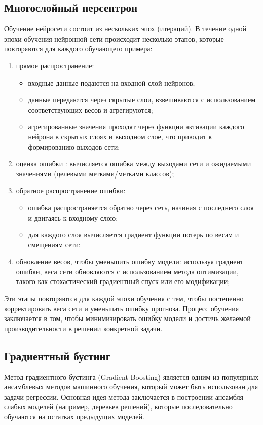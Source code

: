 \subsection{Многослойный персептрон}
Обучение нейросети состоит из нескольких эпох (итераций). В течение одной эпохи обучения нейронной сети происходит несколько этапов, которые повторяются для каждого обучающего примера:
\begin{enumerate}
    \item прямое распространение:
    \begin{itemize}
        \item входные данные подаются на входной слой нейронов;
        \item данные передаются через скрытые слои, взвешиваются с использованием соответствующих весов и агрегируются;
        \item агрегированные значения проходят через функции активации каждого нейрона в скрытых слоях и выходном слое, что приводит к формированию выходов сети;
    \end{itemize}
    \item  оценка ошибки : вычисляется ошибка между выходами сети и ожидаемыми значениями (целевыми метками/метками классов);
    \item обратное распространение ошибки:
    \begin{itemize}
        \item ошибка распространяется обратно через сеть, начиная с последнего слоя и двигаясь к входному слою;
        \item для каждого слоя вычисляется градиент функции потерь по весам и смещениям сети;
    \end{itemize}
    \item обновление весов, чтобы уменьшить ошибку модели: используя градиент ошибки, веса сети обновляются с использованием метода оптимизации, такого как стохастический градиентный спуск или его модификации;
\end{enumerate}

Эти этапы повторяются для каждой эпохи обучения с тем, чтобы постепенно корректировать веса сети и уменьшать ошибку прогноза. Процесс обучения заключается в том, чтобы минимизировать ошибку модели и достичь желаемой производительности в решении конкретной задачи.

\subsection{Градиентный бустинг}
Метод градиентного бустинга (Gradient Boosting) является одним из популярных ансамблевых методов машинного обучения, который может быть использован для задачи регрессии. Основная идея метода заключается в построении ансамбля слабых моделей (например, деревьев решений), которые последовательно обучаются на остатках предыдущих моделей.

